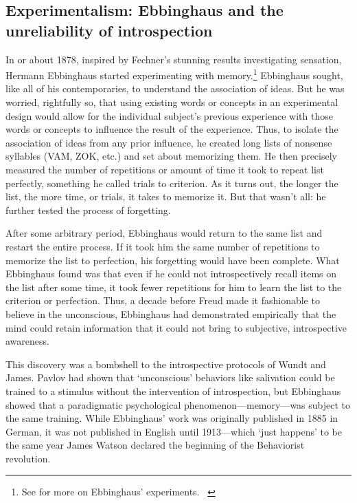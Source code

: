\begin{refsection}
\subsection{Experimentalism: Ebbinghaus and the unreliability of introspection}
\label{experimentalism:ebbinghausandtheunreliabilityofintrospection}

In or about 1878, inspired by Fechner's stunning results investigating sensation, Hermann Ebbinghaus started experimenting with memory.\footnote{See  for more on Ebbinghaus' experiments. ~\citep{Ebbinghaus:1885ud}} Ebbinghaus sought, like all of his contemporaries, to understand the association of ideas. But he was worried, rightfully so, that using existing words or concepts in an experimental design would allow for the individual subject's previous experience with those words or concepts to influence the result of the experience. Thus, to isolate the association of ideas from any prior influence, he created long lists of nonsense syllables (VAM, ZOK, etc.) and set about memorizing them. He then precisely measured the number of repetitions or amount of time it took to repeat list perfectly, something he called trials to criterion. As it turns out, the longer the list, the more time, or trials, it takes to memorize it. But that wasn't all: he further tested the process of forgetting.

After some arbitrary period, Ebbinghaus would return to the same list and restart the entire process. If it took him the same number of repetitions to memorize the list to perfection, his forgetting would have been complete. What Ebbinghaus found was that even if he could not introspectively recall items on the list after some time, it took fewer repetitions for him to learn the list to the criterion or perfection. Thus, a decade before Freud made it fashionable to believe in the unconscious, Ebbinghaus had demonstrated empirically that the mind could retain information that it could not bring to subjective, introspective awareness.

This discovery was a bombshell to the introspective protocols of Wundt and James. Pavlov had shown that `unconscious' behaviors like salivation could be trained to a stimulus without the intervention of introspection, but Ebbinghaus showed that a paradigmatic psychological phenomenon---memory---was subject to the same training. While Ebbinghaus' work was originally published in 1885 in German, it was not published in English until 1913---which `just happens' to be the same year James Watson declared the beginning of the Behaviorist revolution.


\end{refsection}
